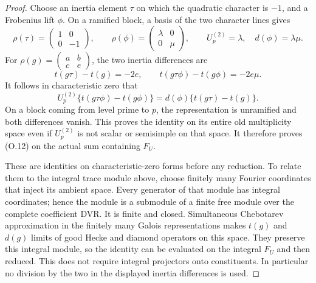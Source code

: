 \begin{proof}
Choose an inertia element $\tau$ on which the quadratic character
is $-1$, and a Frobenius lift $\phi$. On a ramified block, a basis
of the two character lines gives
\[
 \rho(\tau)=\begin{pmatrix}1&0\\0&-1\end{pmatrix},\qquad
 \rho(\phi)=\begin{pmatrix}\lambda&0\\0&\mu\end{pmatrix},
 \qquad U_p^{(2)}=\lambda,\quad d(\phi)=\lambda\mu.
\]
For $\rho(g)=\left(\begin{smallmatrix}a&b\\c&e\end{smallmatrix}\right)$,
the two inertia differences are
\[
 t(g\tau)-t(g)=-2e,\qquad
 t(g\tau\phi)-t(g\phi)=-2e\mu.
\]
It follows in characteristic zero that
\[
 U_p^{(2)}\{t(g\tau\phi)-t(g\phi)\}
       =d(\phi)\{t(g\tau)-t(g)\}.                       \tag{O.12}
\]
On a block coming from level prime to $p$, the representation is
unramified and both differences vanish. This proves the identity
on its entire old multiplicity space even if $U_p^{(2)}$ is not
scalar or semisimple on that space. It therefore proves (O.12)
on the actual sum containing $F_U$.

These are identities on characteristic-zero forms before any
reduction. To relate them to the integral trace module above, choose
finitely many Fourier coordinates that inject its ambient space.
Every generator of that module has integral coordinates; hence the
module is a submodule of a finite free module over the complete
coefficient DVR. It is finite and closed. Simultaneous Chebotarev
approximation in the finitely many Galois representations makes
$t(g)$ and $d(g)$ limits of good Hecke and diamond operators on this
space. They preserve this integral module, so the identity can be
evaluated on the integral $F_U$ and then reduced. This does not
require integral projectors onto constituents. In particular no
division by the two in the displayed inertia differences is used.



\end{proof}
